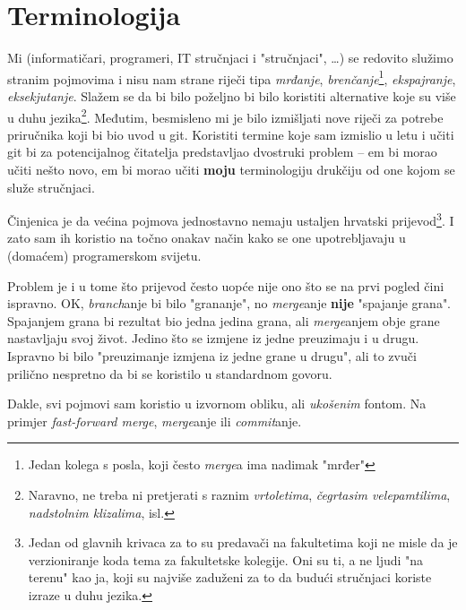 \chapter*{Terminologija}

Mi (informatičari, programeri, IT stručnjaci i "stručnjaci", \dots) se redovito služimo stranim pojmovima i nisu nam strane riječi tipa \emph{mrđanje}, \emph{brenčanje}\footnote{Jedan kolega s posla, koji često \emph{merge}a ima nadimak "mrđer"}, \emph{ekspajranje}, \emph{eksekjutanje}.
Slažem se da bi bilo poželjno bi bilo koristiti alternative koje su više u duhu jezika\footnote{Naravno, ne treba ni pretjerati s raznim \emph{vrtoletima}, \emph{čegrtasim velepamtilima}, \emph{nadstolnim klizalima}, isl.}.
Međutim, besmisleno mi je bilo izmišljati nove riječi za potrebe priručnika koji bi bio uvod u git.
Koristiti termine koje sam izmislio u letu i učiti git bi za potencijalnog čitatelja predstavljao dvostruki problem -- em bi morao učiti nešto novo, em bi morao učiti \textbf{moju} terminologiju drukčiju od one kojom se služe stručnjaci.

Činjenica je da većina pojmova jednostavno nemaju ustaljen hrvatski prijevod\footnote{Jedan od glavnih krivaca za to su predavači na fakultetima koji ne misle da je verzioniranje koda tema za fakultetske kolegije. Oni su ti, a ne ljudi "na terenu" kao ja, koji su najviše zaduženi za to da budući stručnjaci koriste izraze u duhu jezika.}. 
I zato sam ih koristio na točno onakav način kako se one upotrebljavaju u (domaćem) programerskom svijetu.

Problem je i u tome što prijevod često uopće nije ono što se na prvi pogled čini ispravno.
OK, \emph{branch}anje bi bilo "grananje", no \emph{merge}anje \textbf{nije} "spajanje grana". 
Spajanjem grana bi rezultat bio jedna jedina grana, ali \emph{merge}anjem obje grane nastavljaju svoj život. 
Jedino što se izmjene iz jedne preuzimaju i u drugu. 
Ispravno bi bilo "preuzimanje izmjena iz jedne grane u drugu", ali to zvuči prilično nespretno da bi se koristilo u standardnom govoru.

Dakle, svi pojmovi sam koristio u izvornom obliku, ali \emph{ukošenim} fontom. Na primjer \emph{fast-forward merge}, \emph{merge}anje ili \emph{commit}anje.



